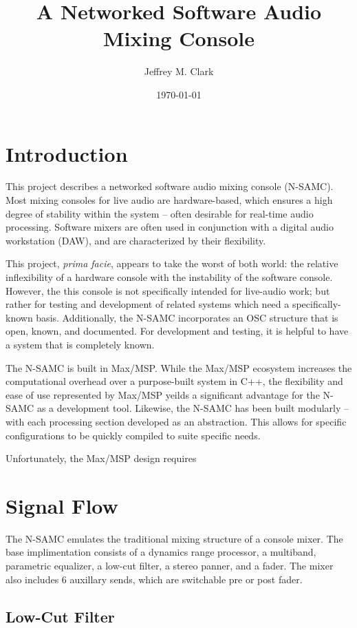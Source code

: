 \documentclass[letterpaper, 12pt, twosided, twocolumn]{article}
\title{A Networked Software Audio Mixing Console}
\author{Jeffrey M. Clark}
\date{\today}
\begin{document}
\maketitle

\section{Introduction}

This project describes a networked software audio mixing console (N-SAMC). Most mixing consoles for live audio are hardware-based, which ensures a high degree of stability within the system -- often desirable for real-time audio processing. Software mixers are often used in conjunction with a digital audio workstation (DAW), and are characterized by their flexibility.

This project, \textit{prima facie}, appears to take the worst of both world: the relative inflexibility of a hardware console with the instability of the software console. However, the this console is not specifically intended for live-audio work; but rather for testing and development of related systems which need a specifically-known basis. Additionally, the N-SAMC incorporates an OSC structure that is open, known, and documented. For development and testing, it is helpful to have a system that is completely known.

The N-SAMC is built in Max/MSP. While the Max/MSP ecosystem increases the computational overhead over a purpose-built system in C++, the flexibility and ease of use represented by Max/MSP yeilds a significant advantage for the N-SAMC as a development tool. Likewise, the N-SAMC has been built modularly -- with each processing section developed as an abstraction. This allows for specific configurations to be quickly compiled to suite specific needs.

Unfortunately, the Max/MSP design requires 

\section{Signal Flow}

The N-SAMC emulates the traditional mixing structure of a console mixer. The base implimentation consists of a dynamics range processor, a multiband, parametric equalizer, a low-cut filter, a stereo panner, and a fader. The mixer also includes 6 auxillary sends, which are switchable pre or post fader.

\subsection{Low-Cut Filter}
\end{document}
